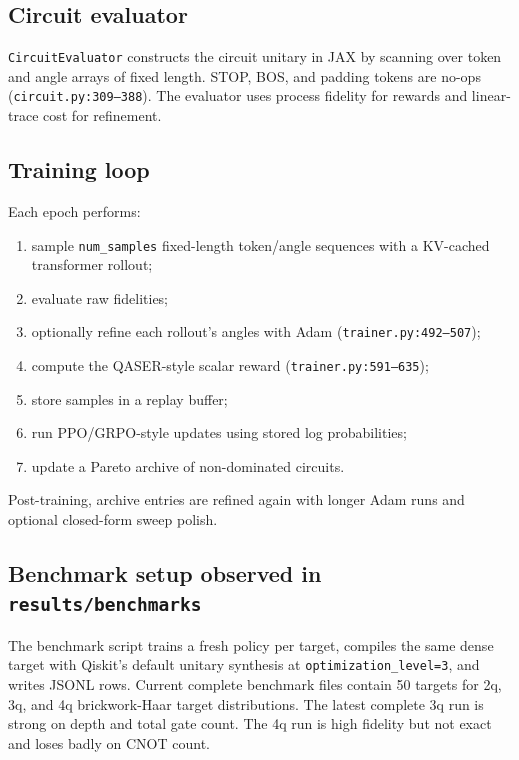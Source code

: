\documentclass[11pt,a4paper]{article}
\begin{document}
\subsection{Circuit evaluator}

\texttt{CircuitEvaluator} constructs the circuit unitary in JAX by scanning
over token and angle arrays of fixed length. STOP, BOS, and padding tokens
are no-ops (\texttt{circuit.py:309--388}). The evaluator uses process fidelity
for rewards and linear-trace cost for refinement.

\subsection{Training loop}

Each epoch performs:
\begin{enumerate}[leftmargin=2em]
  \item sample \texttt{num\_samples} fixed-length token/angle sequences
        with a KV-cached transformer rollout;
  \item evaluate raw fidelities;
  \item optionally refine each rollout's angles with Adam
        (\texttt{trainer.py:492--507});
  \item compute the QASER-style scalar reward
        (\texttt{trainer.py:591--635});
  \item store samples in a replay buffer;
  \item run PPO/GRPO-style updates using stored log probabilities;
  \item update a Pareto archive of non-dominated circuits.
\end{enumerate}
Post-training, archive entries are refined again with longer Adam runs and
optional closed-form sweep polish.

\subsection{Benchmark setup observed in \texttt{results/benchmarks}}

The benchmark script trains a fresh policy per target, compiles the same dense
target with Qiskit's default unitary synthesis at \texttt{optimization\_level=3},
and writes JSONL rows. Current complete benchmark files contain 50 targets for
2q, 3q, and 4q brickwork-Haar target distributions. The latest complete 3q
run is strong on depth and total gate count. The 4q run is high fidelity but
not exact and loses badly on CNOT count.
\end{document}
